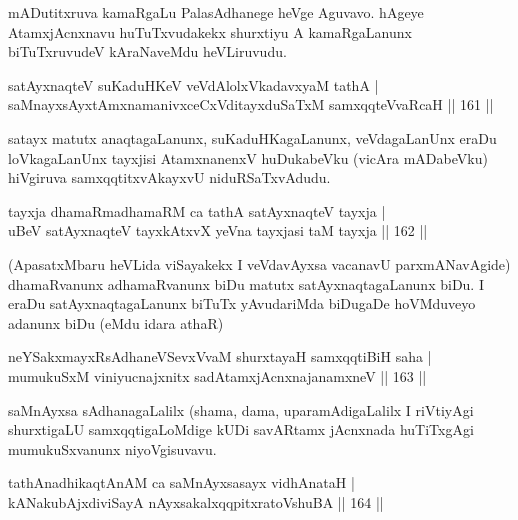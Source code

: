 \begin{artha}%
mADutitxruva kamaRgaLu PalasAdhanege heVge Aguvavo. hAgeye AtamxjAcnxnavu huTuTxvudakekx shurxtiyu A kamaRgaLanunx biTuTxruvudeV kAraNaveMdu heVLiruvudu.
\end{artha}


\begin{shl}
satAyxnaqteV suKaduHKeV veVdAlolxVkadavxyaM tathA |\\
saMnayxsAyx\s \s tAmxnamanivxceCxVditayxduSaTxM samxqqteVvaRcaH \hfill || 161 ||
\end{shl}

\begin{artha}
satayx matutx anaqtagaLanunx, suKaduHKagaLanunx, veVdagaLanUnx eraDu loVkagaLanUnx tayxjisi AtamxnanenxV huDukabeVku (vicAra mADabeVku) hiVgiruva samxqqtitxvAkayxvU niduRSaTxvAdudu.
\end{artha}

\begin{shl}
tayxja dhamaRmadhamaRM ca tathA satAyxnaqteV tayxja |\\
uBeV satAyxnaqteV tayxkAtxvX yeVna tayxjasi taM tayxja \hfill || 162 ||
\end{shl}

\begin{artha}
(ApasatxMbaru heVLida viSayakekx I veVdavAyxsa vacanavU parxmANavAgide) dhamaRvanunx adhamaRvanunx biDu matutx satAyxnaqtagaLanunx biDu. I eraDu satAyxnaqtagaLanunx biTuTx yAvudariMda biDugaDe hoVMduveyo adanunx biDu (eMdu idara athaR) 
\end{artha}

\begin{shl}
neYSakxmayxRsAdhaneVSevxVvaM shurxtayaH samxqqtiBiH saha |\\
mumukuSxM viniyucnajxnitx sadA\s \s tamxjAcnxnajanamxneV \hfill || 163 ||
\end{shl}

\begin{artha}
saMnAyxsa sAdhanagaLalilx (shama, dama, uparamAdigaLalilx I riVtiyAgi shurxtigaLU samxqqtigaLoMdige kUDi savARtamx jAcnxnada huTiTxgAgi mumukuSxvanunx niyoVgisuvavu.
\end{artha}


\begin{shl}
tathA\s nadhikaqtAnAM ca saMnAyxsasayx vidhAnataH |\\
kANakubAjxdiviSayA nAyxsakalxqqpitxratoV\s shuBA \hfill || 164 ||
\end{shl}

